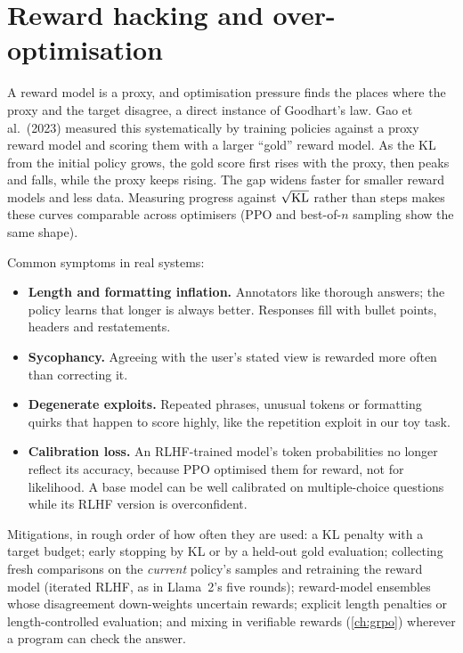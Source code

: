 \section{Reward hacking and over-optimisation}\label{sec:rlhf:overopt}

A reward model is a proxy, and optimisation pressure finds the places where the proxy and the
target disagree, a direct instance of Goodhart's law. Gao et al.\ (2023) measured this systematically
by training policies against a proxy reward model and scoring them with a larger ``gold'' reward model. As the KL
from the initial policy grows, the gold score first rises with the proxy, then peaks and falls,
while the proxy keeps rising. The gap widens faster for smaller reward models and less data.
Measuring progress against $\sqrt{\operatorname{KL}}$ rather than steps makes these curves comparable across
optimisers (PPO and best-of-$n$ sampling show the same shape).

Common symptoms in real systems:
\begin{itemize}
  \item \textbf{Length and formatting inflation.} Annotators like thorough answers; the policy learns
        that longer is always better. Responses fill with bullet points, headers and restatements.
  \item \textbf{Sycophancy.} Agreeing with the user's stated view is rewarded more often than
        correcting it.
  \item \textbf{Degenerate exploits.} Repeated phrases, unusual tokens or formatting quirks that
        happen to score highly, like the repetition exploit in our toy task.
  \item \textbf{Calibration loss.} An RLHF-trained model's token probabilities no longer reflect its
        accuracy, because PPO optimised them for reward, not for likelihood. A base model can be well
        calibrated on multiple-choice questions while its RLHF version is overconfident.
\end{itemize}

Mitigations, in rough order of how often they are used: a KL penalty with a target budget; early
stopping by KL or by a held-out gold evaluation; collecting fresh comparisons on the \emph{current}
policy's samples and retraining the reward model (iterated RLHF, as in Llama~2's five rounds); reward-model ensembles
whose disagreement down-weights uncertain rewards; explicit length penalties or length-controlled
evaluation; and mixing in verifiable rewards (\cref{ch:grpo}) wherever a program can check the
answer.

